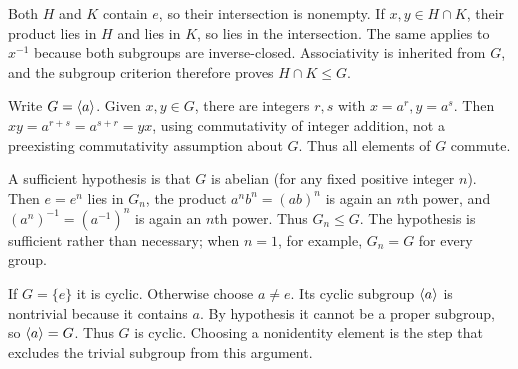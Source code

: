 Both $H$ and $K$ contain $e$, so their intersection is nonempty. If $x,y\in H\cap K$, their product lies in $H$ and lies in $K$, so lies in the intersection. The same applies to $x^{-1}$ because both subgroups are inverse-closed. Associativity is inherited from $G$, and the subgroup criterion therefore proves $H\cap K\le G$.


Write $G=\langle a\rangle$. Given $x,y\in G$, there are integers $r,s$ with $x=a^r,y=a^s$. Then $xy=a^{r+s}=a^{s+r}=yx$, using commutativity of integer addition, not a preexisting commutativity assumption about $G$. Thus all elements of $G$ commute.


A sufficient hypothesis is that $G$ is abelian (for any fixed positive integer $n$). Then $e=e^n$ lies in $G_n$, the product $a^nb^n=(ab)^n$ is again an $n$th power, and $(a^n)^{-1}=(a^{-1})^n$ is again an $n$th power. Thus $G_n\le G$. The hypothesis is sufficient rather than necessary; when $n=1$, for example, $G_n=G$ for every group.


If $G=\{e\}$ it is cyclic. Otherwise choose $a\ne e$. Its cyclic subgroup $\langle a\rangle$ is nontrivial because it contains $a$. By hypothesis it cannot be a proper subgroup, so $\langle a\rangle=G$. Thus $G$ is cyclic. Choosing a nonidentity element is the step that excludes the trivial subgroup from this argument.
